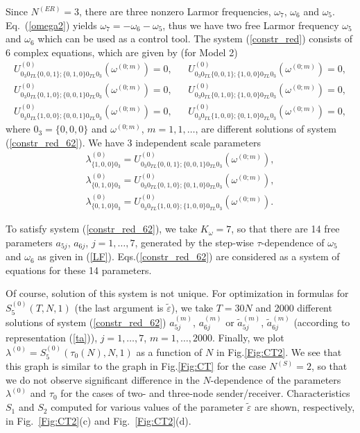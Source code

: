 \documentclass[pra,preprint,showpacs]{revtex4-1}
\begin{document}
{{Since $N^{(ER)}=3$, there are three nonzero Larmor frequencies,
$\omega_{7}$, $\omega_{6}$ and $\omega_{5}$.
Eq.~(\ref{omega2}) yields $\omega_7=-\omega_6-\omega_5$,
thus we have two free Larmor frequency  $\omega_5$ and $\omega_6$
which can be used as a control tool.
The system (\ref{constr_red}) consists of 6 complex equations, which are given by (for Model 2)
\begin{eqnarray}\label{constr_red_62}
U^{(0)}_{0_3 0_{TL} \{0,0,1\};\{0,1,0\} 0_{TL} 0_3}(\omega^{(0;m)})= 0, &&
U^{(0)}_{0_3 0_{TL} \{0,0,1\};\{1,0,0\} 0_{TL} 0_3}(\omega^{(0;m)})= 0,\\\nonumber
U^{(0)}_{0_3 0_{TL} \{0,1,0\};\{0,0,1\} 0_{TL} 0_3}(\omega^{(0;m)})= 0, &&
U^{(0)}_{0_3 0_{TL} \{0,1,0\};\{1,0,0\} 0_{TL} 0_3}(\omega^{(0;m)})= 0,\\\nonumber
U^{(0)}_{0_3 0_{TL} \{1,0,0\};\{0,0,1\} 0_{TL} 0_3}(\omega^{(0;m)})= 0,&&
U^{(0)}_{0_3 0_{TL} \{1,0,0\};\{0,1,0\} 0_{TL} 0_3}(\omega^{(0;m)})= 0,
\end{eqnarray}
where $0_3=\{0,0,0\}$ and $\omega^{(0;m)}$, $m=1,1,\dots$,  are different solutions  of system (\ref{constr_red_62}).
We have 3 independent scale parameters
\begin{eqnarray}\label{lam_num22}
\lambda^{(0)}_{\{1,0,0\} 0_3} = U^{(0)}_{0_3 0_{TL} \{0,0,1\};\{0,0,1\} 0_{TL} 0_3}(\omega^{(0;m)}),\\\nonumber
\lambda^{(0)}_{\{0,1,0\} 0_3} = U^{(0)}_{0_3 0_{TL} \{0,1,0\};\{0,1,0\} 0_{TL} 0_3}(\omega^{(0;m)}),\\\nonumber
\lambda^{(0)}_{\{0,1,0\} 0_3} = U^{(0)}_{0_3 0_{TL} \{1,0,0\};\{1,0,0\} 0_{TL} 0_3}(\omega^{(0;m)}).
\end{eqnarray}

To satisfy system (\ref{constr_red_62}), we take $K_\omega=7$, so that there are 14 free parameters
$a_{5j}$, $a_{6j}$,  $j=1,\dots,7$,
generated by the step-wise $\tau$-dependence of $\omega_5$ and $\omega_6$
as given in (\ref{LF}). Eqs.(\ref{constr_red_62}) are considered as a system of equations for these 14 parameters.

Of course, solution of this system is not unique.
For optimization in formulas for $S_5^{(0)}(T,N,1)$ (the last argument is $\tilde\varepsilon$),
we take $T=30 N$ and 2000 different solutions of system (\ref{constr_red_62}) $a^{(m)}_{5j}$, $a^{(m)}_{6j}$ or $\tilde a^{(m)}_{5j}$,
$\tilde a^{(m)}_{6j}$ (according to representation (\ref{ta})), $j=1,\dots,7$, $m=1,\dots,2000$.
Finally, we plot  $\lambda^{(0)}=S_5^{(0)}(\tau_0(N),N,1)$ as a function of $N$ in Fig.\ref{Fig:CT2}.
We see that this graph is similar to the graph in Fig.\ref{Fig:CT} for the case $N^{(S)}=2$, so that we do not observe significant difference in the $N$-dependence of the parameters $\lambda^{(0)}$ and $\tau_0$ for the cases of two- and three-node sender/receiver. {Characteristics $S_1$ and $S_2$ computed for various values of the parameter $\tilde\varepsilon$ are shown, respectively, in Fig.~\ref{Fig:CT2}(c) and Fig.~\ref{Fig:CT2}(d).}


}}
\end{document}
